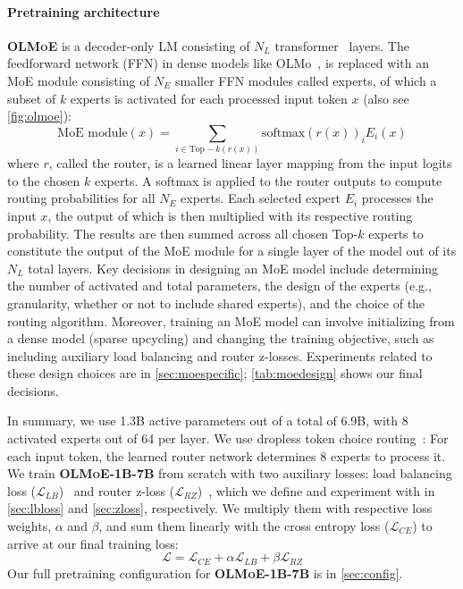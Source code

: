 \documentclass{article}
\newcommand{\model}{\textbf{\textsc{OLMoE}}}
\newcommand{\modelsmall}{\textbf{\textsc{OLMoE-1B-7B}}}
\begin{document}
\paragraph{Pretraining architecture} \model{} is a decoder-only LM consisting of $N_{L}$ transformer~\citep{vaswani2023attention} layers. The feedforward network (FFN) in dense models like OLMo~\citep{groeneveld2024olmo}, is replaced with an MoE module consisting of $N_{E}$ smaller FFN modules called experts, of which a subset of $k$ experts is activated for each processed input token $x$ (also see \autoref{fig:olmoe}):
\begin{equation}
\label{eq:moe}
\text{MoE module}(x)=\sum_{i \in \text{Top}-k(r(x))} \mathrm{softmax} \left( r(x) \right)_i {E_i(x)}
\end{equation}
where $r$, called the router, is a learned linear layer mapping from the input logits to the chosen $k$ experts. A softmax is applied to the router outputs to compute routing probabilities for all $N_E$ experts. Each selected expert $E_i$ processes the input $x$, the output of which is then multiplied with its respective routing probability. The results are then summed across all chosen Top-$k$ experts to constitute the output of the MoE module for a single layer of the model out of its $N_L$ total layers. Key decisions in designing an MoE model include determining the number of activated and total parameters, the design of the experts (e.g., granularity, whether or not to include shared experts), and the choice of the routing algorithm. Moreover, training an MoE model can involve initializing from a dense model (sparse upcycling) and changing the training objective, such as including auxiliary load balancing and router z-losses. Experiments related to these design choices are in \autoref{sec:moespecific}; \autoref{tab:moedesign} shows our final decisions. 

In summary, we use 1.3B active parameters out of a total of 6.9B, with 8 activated experts out of 64 per layer. We use dropless token choice routing~\citep{gale2022megablocksefficientsparsetraining}: For each input token, the learned router network determines 8 experts to process it. We train \modelsmall{} from scratch with two auxiliary losses: load balancing loss ($\mathcal{L}_{LB}$)~\citep{shazeer2017outrageously} and router z-loss ($\mathcal{L}_{RZ}$)~\citep{zoph2022stmoe}, which we define and experiment with in \autoref{sec:lbloss} and \autoref{sec:zloss}, respectively. We multiply them with respective loss weights, $\alpha$ and $\beta$, and sum them linearly with the cross entropy loss ($\mathcal{L}_{\textit{CE}}$) to arrive at our final training loss:
\begin{equation}
\label{eq:loss}
\mathcal{L} = \mathcal{L}_{\textit{CE}} + \alpha \mathcal{L}_{\textit{LB}} + \beta \mathcal{L}_{\textit{RZ}}
\end{equation}
Our full pretraining configuration for \modelsmall{} is in \autoref{sec:config}.
\end{document}
